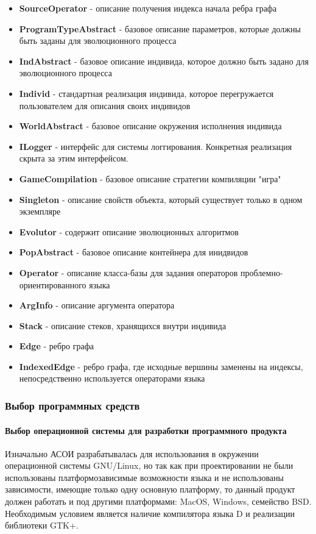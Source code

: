 \documentclass[russian,utf8,emptystyle]{eskdtext}
\begin{document}
\begin{spacing}{1.5}
\begin{itemize}
\item \textbf{SourceOperator} - описание получения индекса начала ребра графа
\item \textbf{ProgramTypeAbstract} - базовое описание параметров, которые должны быть заданы для эволюционного процесса
\item \textbf{IndAbstract} - базовое описание индивида, которое должно быть задано для эволюционного процесса
\item \textbf{Individ} - стандартная реализация индивида, которое перегружается пользователем для описания своих индивидов
\item \textbf{WorldAbstract} - базовое описание окружения исполнения индивида
\item \textbf{ILogger} - интерфейс для системы логгирования. Конкретная реализация скрыта за этим интерфейсом.
\item \textbf{GameCompilation} - базовое описание стратегии компиляции "игра"
\item \textbf{Singleton} - описание свойств объекта, который существует только в одном экземпляре
\item \textbf{Evolutor} - содержит описание эволюционных алгоритмов
\item \textbf{PopAbstract} - базовое описание контейнера для инидвидов
\item \textbf{Operator} - описание класса-базы для задания операторов проблемно-ориентированного языка
\item \textbf{ArgInfo} - описание аргумента оператора
\item \textbf{Stack}  - описание стеков, хранящихся внутри индивида
\item \textbf{Edge} - ребро графа
\item \textbf{IndexedEdge} - ребро графа, где исходные вершины заменены на индексы, непосредственно используется операторами языка
\end{itemize}

\subsubsection{Выбор программных средств}

\paragraph{Выбор операционной системы для разработки программного продукта}
Изначально АСОИ разрабатывалась для использования в окружении операционной системы GNU/Linux, но так как при проектировании не были использованы платформозависимые возможности языка и не использованы зависимости, имеющие только одну основную платформу, то данный продукт должен работать и под другими платформами: MacOS, Windows, семейство BSD. Необходимым условием является наличие компилятора языка D и реализации библиотеки GTK+.


\end{spacing}
\end{document}
